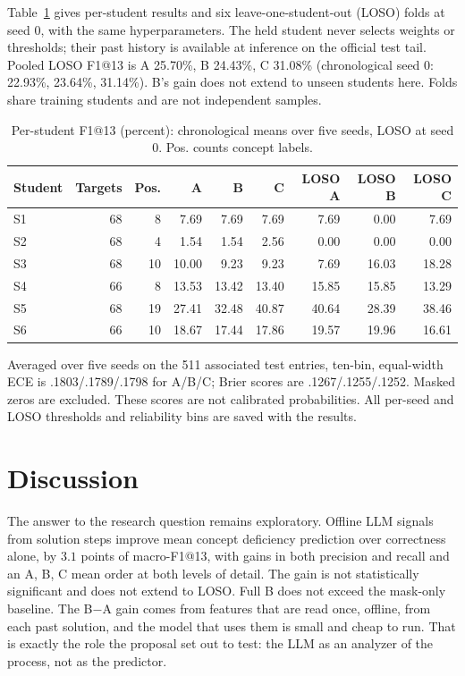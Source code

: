 \documentclass[11pt]{article}
\begin{document}
Table~\ref{tab:students} gives per-student results and six leave-one-student-out
(LOSO) folds at seed 0, with the same hyperparameters. The held student never
selects weights or thresholds; their past history is available at inference on the official test tail.
Pooled LOSO F1@13 is A 25.70\%, B 24.43\%, C 31.08\% (chronological seed 0:
22.93\%, 23.64\%, 31.14\%). B's gain does not extend to unseen students here.
Folds share training students and are not independent samples.
\begin{table}[htbp]\centering\small
\caption{Per-student F1@13 (percent): chronological means over five seeds, LOSO at seed 0. Pos. counts concept labels.}\label{tab:students}
\begin{tabular}{@{}lrrrrrrrr@{}}\toprule
Student & Targets & Pos. & A & B & C & LOSO A & LOSO B & LOSO C\\\midrule
S1 & 68 & 8 & 7.69 & 7.69 & 7.69 & 7.69 & 0.00 & 7.69\\
S2 & 68 & 4 & 1.54 & 1.54 & 2.56 & 0.00 & 0.00 & 0.00\\
S3 & 68 & 10 & 10.00 & 9.23 & 9.23 & 7.69 & 16.03 & 18.28\\
S4 & 66 & 8 & 13.53 & 13.42 & 13.40 & 15.85 & 15.85 & 13.29\\
S5 & 68 & 19 & 27.41 & 32.48 & 40.87 & 40.64 & 28.39 & 38.46\\
S6 & 66 & 10 & 18.67 & 17.44 & 17.86 & 19.57 & 19.96 & 16.61\\
\bottomrule\end{tabular}\end{table}

Averaged over five seeds on the 511 associated test entries, ten-bin, equal-width ECE is .1803/.1789/.1798 for A/B/C;
Brier scores are .1267/.1255/.1252. Masked zeros are excluded. These scores are not
calibrated probabilities. All per-seed and LOSO thresholds and reliability bins are
saved with the results.


\section{Discussion}
The answer to the research question remains exploratory. Offline LLM signals from solution
steps improve mean concept deficiency prediction over correctness alone, by $3.1$ points
of macro-F1@13, with gains in both precision and recall and an A, B, C mean order
at both levels of detail. The gain is not statistically significant and does not extend to LOSO. Full B does not exceed the mask-only baseline. The B$-$A gain comes from features that are read once,
offline, from each past solution, and the model that uses them is small and cheap to
run. That is exactly the role the proposal set out to test: the LLM as an analyzer of the
process, not as the predictor.
\end{document}

